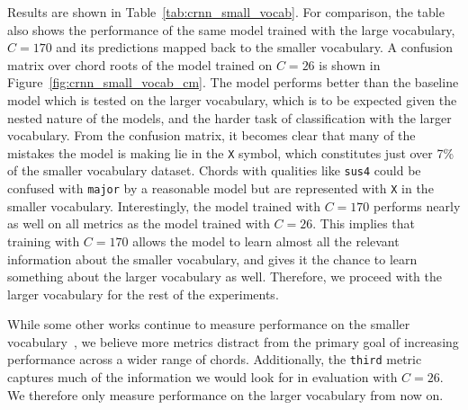 

Results are shown in Table~\ref{tab:crnn_small_vocab}. For comparison, the table also shows the performance of the same model trained with the large vocabulary, $C=170$ and its predictions mapped back to the smaller vocabulary. A confusion matrix over chord roots of the model trained on $C=26$ is shown in Figure~\ref{fig:crnn_small_vocab_cm}. The model performs better than the baseline model which is tested on the larger vocabulary, which is to be expected given the nested nature of the models, and the harder task of classification with the larger vocabulary. From the confusion matrix, it becomes clear that many of the mistakes the model is making lie in the \texttt{X} symbol, which constitutes just over 7\% of the smaller vocabulary dataset. Chords with qualities like \texttt{sus4} could be confused with \texttt{major} by a reasonable model but are represented with \texttt{X} in the smaller vocabulary. Interestingly, the model trained with $C=170$ performs nearly as well on all metrics as the model trained with $C=26$. This implies that training with $C=170$ allows the model to learn almost all the relevant information about the smaller vocabulary, and gives it the chance to learn something about the larger vocabulary as well. Therefore, we proceed with the larger vocabulary for the rest of the experiments.

While some other works continue to measure performance on the smaller vocabulary~\citep{BTC}, we believe more metrics distract from the primary goal of increasing performance across a wider range of chords. Additionally, the \texttt{third} metric captures much of the information we would look for in evaluation with $C=26$. We therefore only measure performance on the larger vocabulary from now on.

